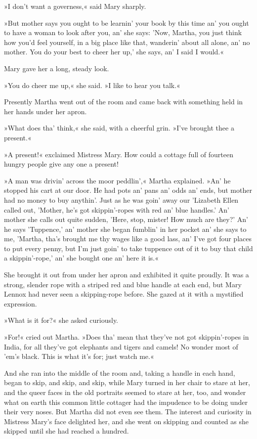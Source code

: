 »I don't want a governess,« said Mary sharply.

»But mother says you ought to be learnin' your book by this time an' you ought to have a woman to look after you, an' she says: 'Now, Martha, you just think how you'd feel yourself, in a big place like that, wanderin' about all alone, an' no mother. You do your best to cheer her up,' she says, an' I said I would.«

Mary gave her a long, steady look.

»You do cheer me up,« she said. »I like to hear you talk.«

Presently Martha went out of the room and came back with something held in her hands under her apron.

»What does tha' think,« she said, with a cheerful grin. »I've brought thee a present.«

»A present!« exclaimed Mistress Mary. How could a cottage full of fourteen hungry people give any one a present!

»A man was drivin' across the moor peddlin',« Martha explained. »An' he stopped his cart at our door. He had pots an' pans an' odds an' ends, but mother had no money to buy anythin'. Just as he was goin' away our 'Lizabeth Ellen called out, 'Mother, he's got skippin'-ropes with red an' blue handles.' An' mother she calls out quite sudden, 'Here, stop, mister! How much are they?' An' he says 'Tuppence,' an' mother she began fumblin' in her pocket an' she says to me, 'Martha, tha's brought me thy wages like a good lass, an' I've got four places to put every penny, but I'm just goin' to take tuppence out of it to buy that child a skippin'-rope,' an' she bought one an' here it is.«

She brought it out from under her apron and exhibited it quite proudly. It was a strong, slender rope with a striped red and blue handle at each end, but Mary Lennox had never seen a skipping-rope before. She gazed at it with a mystified expression.

»What is it for?« she asked curiously.

»For!« cried out Martha. »Does tha' mean that they've not got skippin'-ropes in India, for all they've got elephants and tigers and camels! No wonder most of 'em's black. This is what it's for; just watch me.«

And she ran into the middle of the room and, taking a handle in each hand, began to skip, and skip, and skip, while Mary turned in her chair to stare at her, and the queer faces in the old portraits seemed to stare at her, too, and wonder what on earth this common little cottager had the impudence to be doing under their very noses. But Martha did not even see them. The interest and curiosity in Mistress Mary's face delighted her, and she went on skipping and counted as she skipped until she had reached a hundred.

